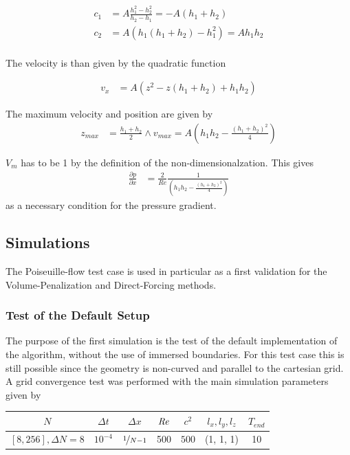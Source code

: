 \begin{align}
c_1 &= A\frac{h_1^2 -h_2^2}{h_2 - h_1} = -A(h_1+h_2)\\
c_2 &= A(h_1(h_1 + h_2) - h_1^2) = Ah_1h_2\\
\end{align}

The velocity is than given by the quadratic function

\begin{align}
\label{vali:pflow_theosol}
v_x &= A(z^2 - z(h_1 + h_2) + h_1h_2)
\end{align}

The maximum velocity and position are given by
\begin{align}
z_{max} &= \frac{h_1+h_2}{2} \wedge v_{max} = A\left(h_1h_2 - \frac{(h_1 + h_2)^2}{4}\right)
\end{align}

$V_{m}$ has to be 1 by the definition of the non-dimensionalzation. This gives
\begin{align}
\frac{\partial p}{\partial x} &= \frac{2}{Re}\frac{1}{\left(h_1h_2 - \frac{(h_1+h_2)^2}{4} \right)}
\end{align}
as a necessary condition for the pressure gradient.\\
\clearpage

\subsection{Simulations}

The Poiseuille-flow test case is used in particular as a first validation
for the Volume-Penalization and Direct-Forcing methods.

\subsubsection{Test of the Default Setup}

The purpose of the first simulation is the test of the default
implementation of the algorithm, without the use of immersed boundaries.
For this test case this is still possible since the geometry is non-curved
and parallel to the cartesian grid.
A grid convergence test was performed with the main simulation parameters given by

\begin{center}
\vspace*{0.7ex}
\begin{tabular}{c|c|c|c|c|c|c }
 $ N  $                   & $\Delta t$ & $\Delta x$            & $\mbox{\textit{Re}}$  & $c^2$   & $l_x, l_y, l_z$ & $T_{end}$\\
\hline
 $[8, 256], \Delta N = 8 $& $10^{-4}$ & $\nicefrac{1}{N - 1}$ & 500     & $500$   & (1, 1, 1)       & 10\\
\end{tabular}
\vspace*{0.7ex}
\end{center}

